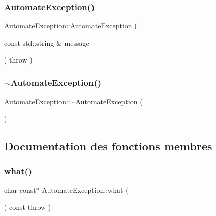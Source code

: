 \subsubsection{\texorpdfstring{Automate\+Exception()}{AutomateException()}}
{\footnotesize\ttfamily Automate\+Exception\+::\+Automate\+Exception (\begin{DoxyParamCaption}\item[{const std\+::string \&}]{message }\end{DoxyParamCaption}) throw  ) \hspace{0.3cm}{\ttfamily [inline]}}

\mbox{\label{class_automate_exception_aac1e142017119bf9116fac7cdd6b0a07}} 
\subsubsection{\texorpdfstring{$\sim$\+Automate\+Exception()}{~AutomateException()}}
{\footnotesize\ttfamily Automate\+Exception\+::$\sim$\+Automate\+Exception (\begin{DoxyParamCaption}{ }\end{DoxyParamCaption})\hspace{0.3cm}{\ttfamily [inline]}}



\subsection{Documentation des fonctions membres}
\mbox{\label{class_automate_exception_aec651fff04401e5d6eb3ee1804f1afcd}} 
\subsubsection{\texorpdfstring{what()}{what()}}
{\footnotesize\ttfamily char const$\ast$ Automate\+Exception\+::what (\begin{DoxyParamCaption}{ }\end{DoxyParamCaption}) const throw  ) \hspace{0.3cm}{\ttfamily [inline]}}




